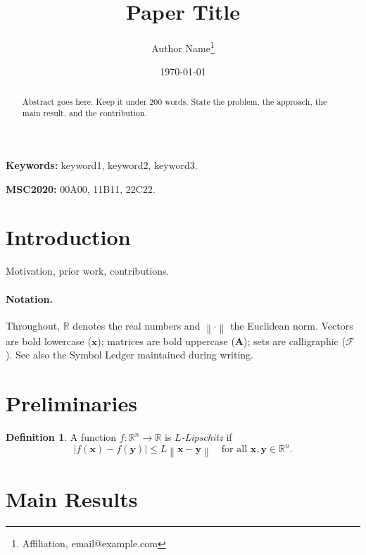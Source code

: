 \documentclass[11pt,a4paper]{article}
\title{Paper Title}
\author{Author Name\thanks{Affiliation, email@example.com}}
\date{\today}
\theoremstyle{plain}
\theoremstyle{definition}
\newtheorem{definition}[theorem]{Definition}
\theoremstyle{remark}
\numberwithin{equation}{section}
\newcommand{\R}{\mathbb{R}}
\newcommand{\norm}[1]{\left\lVert #1 \right\rVert}
\newcommand{\abs}[1]{\left\lvert #1 \right\rvert}
\begin{document}
\maketitle

\begin{abstract}
Abstract goes here. Keep it under 200 words. State the problem, the approach,
the main result, and the contribution.
\end{abstract}

\noindent\textbf{Keywords:} keyword1, keyword2, keyword3.

\noindent\textbf{MSC2020:} 00A00, 11B11, 22C22.

\section{Introduction}\label{sec:intro}

Motivation, prior work, contributions.

\paragraph{Notation.}
Throughout, $\R$ denotes the real numbers and $\norm{\cdot}$ the Euclidean
norm. Vectors are bold lowercase ($\bm{x}$); matrices are bold uppercase ($\bm{A}$);
sets are calligraphic ($\mathcal{F}$). See also the Symbol Ledger maintained
during writing.

\section{Preliminaries}\label{sec:prelim}

\begin{definition}\label{def:lipschitz}
A function $f : \R^n \to \R$ is \emph{$L$-Lipschitz} if
\begin{equation}\label{eq:lipschitz}
\abs{f(\bm{x}) - f(\bm{y})} \le L \norm{\bm{x} - \bm{y}}
\quad \text{for all } \bm{x}, \bm{y} \in \R^n.
\end{equation}
\end{definition}

\section{Main Results}\label{sec:main}
\end{document}

